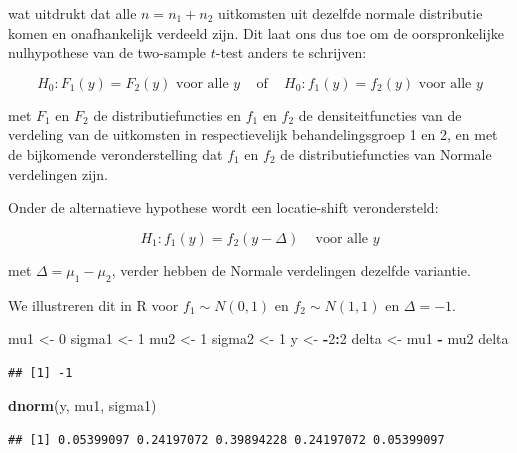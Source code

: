 \documentclass[
  12pt,dutch]{book}
\newenvironment{Shaded}{\begin{snugshade}}{\end{snugshade}}
\newcommand{\DecValTok}[1]{\textcolor[rgb]{0.00,0.00,0.81}{#1}}
\newcommand{\FunctionTok}[1]{\textcolor[rgb]{0.13,0.29,0.53}{\textbf{#1}}}
\newcommand{\NormalTok}[1]{#1}
\newcommand{\OtherTok}[1]{\textcolor[rgb]{0.56,0.35,0.01}{#1}}
\newcommand{\SpecialCharTok}[1]{\textcolor[rgb]{0.81,0.36,0.00}{\textbf{#1}}}
\theoremstyle{definition}
\theoremstyle{definition}
\theoremstyle{definition}
\theoremstyle{definition}
\theoremstyle{remark}
\begin{document}
wat uitdrukt dat alle \(n=n_1+n_2\) uitkomsten uit dezelfde normale distributie komen en onafhankelijk verdeeld zijn. Dit laat ons dus toe om de oorspronkelijke nulhypothese van de two-sample \(t\)-test anders te schrijven:

\begin{equation}
H_0: F_1(y) = F_2(y) \text{ voor alle } y \;\;\;\text{ of }\;\;\; H_0: f_1(y) = f_2(y) \text{ voor alle } y \label{eq:H0F1F2}
\end{equation}

met \(F_1\) en \(F_2\) de distributiefuncties en \(f_1\) en \(f_2\) de densiteitfuncties van de verdeling van de uitkomsten in respectievelijk behandelingsgroep 1 en 2, en met de bijkomende veronderstelling dat \(f_1\) en \(f_2\) de distributiefuncties van Normale verdelingen zijn.

Onder de alternatieve hypothese wordt een locatie-shift verondersteld:

\[H_1: f_1(y)=f_2(y-\Delta) \;\;\;\text{ voor alle } y\]

met \(\Delta=\mu_1-\mu_2\), verder hebben de Normale verdelingen dezelfde variantie.

We illustreren dit in R voor \(f_1\sim N(0,1)\) en \(f_2\sim N(1,1)\) en \(\Delta=-1\).

\begin{Shaded}
\begin{Highlighting}[]
\NormalTok{mu1 }\OtherTok{\textless{}{-}} \DecValTok{0}
\NormalTok{sigma1 }\OtherTok{\textless{}{-}} \DecValTok{1}
\NormalTok{mu2 }\OtherTok{\textless{}{-}} \DecValTok{1}
\NormalTok{sigma2 }\OtherTok{\textless{}{-}} \DecValTok{1}
\NormalTok{y }\OtherTok{\textless{}{-}} \SpecialCharTok{{-}}\DecValTok{2}\SpecialCharTok{:}\DecValTok{2}
\NormalTok{delta }\OtherTok{\textless{}{-}}\NormalTok{ mu1 }\SpecialCharTok{{-}}\NormalTok{ mu2}
\NormalTok{delta}
\end{Highlighting}
\end{Shaded}

\begin{verbatim}
## [1] -1
\end{verbatim}

\begin{Shaded}
\begin{Highlighting}[]
\FunctionTok{dnorm}\NormalTok{(y, mu1, sigma1)}
\end{Highlighting}
\end{Shaded}

\begin{verbatim}
## [1] 0.05399097 0.24197072 0.39894228 0.24197072 0.05399097
\end{verbatim}
\end{document}

